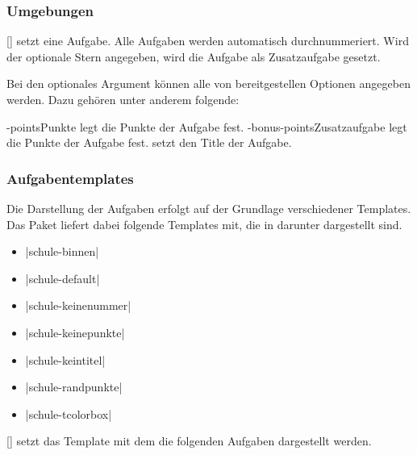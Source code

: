 \subsubsection{Umgebungen}
\begin{environments}
    []%
        setzt eine Aufgabe. Alle Aufgaben werden automatisch durchnummeriert. Wird der optionale Stern angegeben, wird die Aufgabe als Zusatzaufgabe gesetzt.

        Bei den optionales Argument können alle von  bereitgestellen Optionen angegeben werden. Dazu gehören unter anderem folgende:
        \begin{options}
            \keyval-{points}{Punkte} legt die Punkte der Aufgabe fest.
            \keyval-{bonus-points}{Zusatzaufgabe} legt die Punkte der Aufgabe fest.
             setzt den Title der Aufgabe.
        \end{options}
\end{environments}

\subsubsection{Aufgabentemplates}
    Die Darstellung der Aufgaben erfolgt auf der Grundlage verschiedener Templates. Das Paket  liefert dabei folgende Templates mit, die in darunter dargestellt sind.
    \begin{itemize}
        \item \verbcode|schule-binnen|
        \item \verbcode|schule-default|
        \item \verbcode|schule-keinenummer|
        \item \verbcode|schule-keinepunkte|
        \item \verbcode|schule-keintitel|
        \item \verbcode|schule-randpunkte|
        \item \verbcode|schule-tcolorbox|
    \end{itemize}


    \begin{commands}
        [] setzt das Template mit dem die folgenden Aufgaben dargestellt werden.
    \end{commands}

